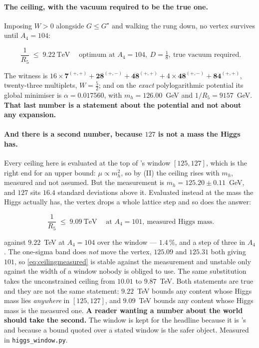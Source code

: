 \documentclass[11pt,a4paper]{article}
\newcommand{\rep}[1]{\mathbf{#1}}
\newenvironment{keyeq}
  {\begin{center}\setlength{\fboxsep}{9pt}\setlength{\fboxrule}{0.8pt}%
   \begin{lrbox}{\keyeqbox}\begin{minipage}{0.88\textwidth}}
  {\end{minipage}\end{lrbox}%
   \fcolorbox{hdrblue!55}{hdrblue!6}{\usebox{\keyeqbox}}\end{center}}
\begin{document}
\paragraph{The ceiling, with the vacuum required to be the true one.} Imposing $W>0$ alongside
$G\le G^\star$ and walking the rung down, no vertex survives until $A_4=104$:
\begin{keyeq}
\begin{equation}\label{eq:ceilingtrue}
  \boxed{\;\frac{1}{R_5}\;\le\;9.22\ \text{TeV}\;}
  \quad\text{optimum at } A_4=104,\ D=\tfrac18,\ \text{true vacuum required.}
\end{equation}
\end{keyeq}
\noindent The witness is
$16\times\rep7^{(+,+)}+\rep{28}^{(+,-)}+\rep{48}^{(+,+)}+4\times\rep{48}^{(+,-)}+\rep{84}^{(+,+)}$,
twenty-three multiplets, $W=\tfrac52$; and on the \emph{exact} polylogarithmic potential its global
minimiser is $\alpha=0.017560$, with $m_h=126.00$~GeV and $1/R_5=9157$~GeV. \textbf{That last
number is a statement about the potential and not about any expansion.}

\paragraph{And there is a second number, because $127$ is not a mass the Higgs has.} Every ceiling
here is evaluated at the top of \cite{KM25}'s window $[125,127]$, which is the right end for an
upper bound: $\mu\propto m_h^2$, so by (II) the ceiling rises with $m_h$, measured and not assumed.
But the measurement is $m_h=125.20\pm0.11$~GeV, and $127$ sits $16.4$ standard deviations above it.
Evaluated instead at the mass the Higgs actually has, the vertex drops a whole lattice step and so
does the answer:
\begin{keyeq}
\begin{equation}\label{eq:ceilingmeasured}
  \boxed{\;\frac{1}{R_5}\;\le\;9.09\ \text{TeV}\;}
  \quad\text{at } A_4=101,\ \text{measured Higgs mass.}
\end{equation}
\end{keyeq}
against $9.22$~TeV at $A_4=104$ over the window --- $1.4\,\%$, and a step of three in $A_4$. The
one-sigma band does \emph{not} move the vertex, $125.09$ and $125.31$ both giving $101$, so
\eqref{eq:ceilingmeasured} is stable against the measurement and unstable only against the width of
a window nobody is obliged to use. The same substitution takes the unconstrained ceiling from
$10.01$ to $9.87$~TeV. Both statements are true and they are not the same statement: $9.22$~TeV
bounds any content whose Higgs mass lies \emph{anywhere} in $[125,127]$, and $9.09$~TeV bounds any
content whose Higgs mass is the measured one. \textbf{A reader wanting a number about the world
should take the second.} The window is kept for the headline because it is \cite{KM25}'s and
because a bound quoted over a stated window is the safer object. Measured in
\texttt{higgs\_\allowbreak window.py}.
\end{document}
